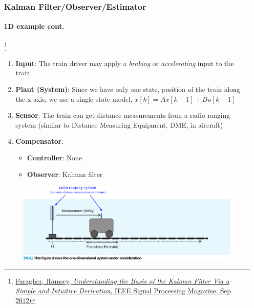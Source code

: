 \documentclass{beamer}
\newenvironment{changemargin}[2]
	{
	  	\begin{list}{}
		{
			\setlength{\topsep}{0pt}%
			\setlength{\leftmargin}{#1}%
			\setlength{\rightmargin}{#2}%
			\setlength{\listparindent}{\parindent}%
			\setlength{\itemindent}{\parindent}%
			\setlength{\parsep}{\parskip}%
		}
	  	\item[]
		}
		{\end{list}
	}
\begin{document}
\begin{frame}[plain]
\frametitle{Kalman Filter/Observer/Estimator}
\framesubtitle{1D example \tiny cont.}

\footnote{\tiny\hspace{-0.23in} \href{http://www.cl.cam.ac.uk/~rmf25/papers/Understanding the Basis of the Kalman Filter.pdf}{Faragher, Ramsey, \emph{Understanding the Basis of the Kalman Filter Via a Simple and Intuitive Derivation}, IEEE Signal Processing Magazine, Sep 2012}}
\scriptsize
\begin{changemargin}{-1.3in}{0in}
\begin{enumerate}\scriptsize
\item \textbf{Input}: The train driver may apply a \emph{braking} or \emph{accelerating} input to the train
\item \textbf{Plant (System)}: Since we have only one state, position of the train along the x axis, we use a single state model, $x[k]=Ax[k-1]+Bu[k-1]$
\item \textbf{Sensor}: The train can get distance measurements from a radio ranging system (similar to Distance Measuring Equipment, DME, in aircraft)
\item \textbf{Compensator}:
\begin{itemize}\scriptsize
\item \textbf{Controller}: None 
\item \textbf{Observer}: Kalman filter
\end{itemize}
\end{enumerate}
\begin{figure}[h]
\centering
\includegraphics[width=1.35\textwidth]{figs/2012_MAG_Understanding_the_Basis_of_the_Kalman_Filter_fig1.pdf}
\end{figure}
\end{changemargin}
\end{frame}
\end{document}
